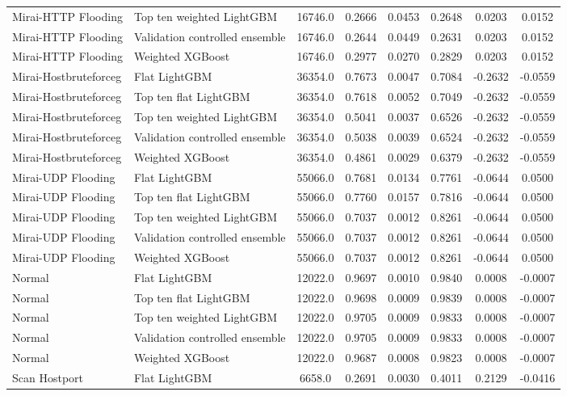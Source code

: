 \documentclass[10pt]{article}
\begin{document}
\begin{center}
\begin{longtable}{p{2.4cm}p{2.6cm}cccccc}
Mirai-HTTP Flooding & Top ten weighted LightGBM & 16746.0 & 0.2666 & 0.0453 & 0.2648 & 0.0203 & 0.0152 \\
Mirai-HTTP Flooding & Validation controlled ensemble & 16746.0 & 0.2644 & 0.0449 & 0.2631 & 0.0203 & 0.0152 \\
Mirai-HTTP Flooding & Weighted XGBoost & 16746.0 & 0.2977 & 0.0270 & 0.2829 & 0.0203 & 0.0152 \\
Mirai-Hostbruteforceg & Flat LightGBM & 36354.0 & 0.7673 & 0.0047 & 0.7084 & -0.2632 & -0.0559 \\
Mirai-Hostbruteforceg & Top ten flat LightGBM & 36354.0 & 0.7618 & 0.0052 & 0.7049 & -0.2632 & -0.0559 \\
Mirai-Hostbruteforceg & Top ten weighted LightGBM & 36354.0 & 0.5041 & 0.0037 & 0.6526 & -0.2632 & -0.0559 \\
Mirai-Hostbruteforceg & Validation controlled ensemble & 36354.0 & 0.5038 & 0.0039 & 0.6524 & -0.2632 & -0.0559 \\
Mirai-Hostbruteforceg & Weighted XGBoost & 36354.0 & 0.4861 & 0.0029 & 0.6379 & -0.2632 & -0.0559 \\
Mirai-UDP Flooding & Flat LightGBM & 55066.0 & 0.7681 & 0.0134 & 0.7761 & -0.0644 & 0.0500 \\
Mirai-UDP Flooding & Top ten flat LightGBM & 55066.0 & 0.7760 & 0.0157 & 0.7816 & -0.0644 & 0.0500 \\
Mirai-UDP Flooding & Top ten weighted LightGBM & 55066.0 & 0.7037 & 0.0012 & 0.8261 & -0.0644 & 0.0500 \\
Mirai-UDP Flooding & Validation controlled ensemble & 55066.0 & 0.7037 & 0.0012 & 0.8261 & -0.0644 & 0.0500 \\
Mirai-UDP Flooding & Weighted XGBoost & 55066.0 & 0.7037 & 0.0012 & 0.8261 & -0.0644 & 0.0500 \\
Normal & Flat LightGBM & 12022.0 & 0.9697 & 0.0010 & 0.9840 & 0.0008 & -0.0007 \\
Normal & Top ten flat LightGBM & 12022.0 & 0.9698 & 0.0009 & 0.9839 & 0.0008 & -0.0007 \\
Normal & Top ten weighted LightGBM & 12022.0 & 0.9705 & 0.0009 & 0.9833 & 0.0008 & -0.0007 \\
Normal & Validation controlled ensemble & 12022.0 & 0.9705 & 0.0009 & 0.9833 & 0.0008 & -0.0007 \\
Normal & Weighted XGBoost & 12022.0 & 0.9687 & 0.0008 & 0.9823 & 0.0008 & -0.0007 \\
Scan Hostport & Flat LightGBM & 6658.0 & 0.2691 & 0.0030 & 0.4011 & 0.2129 & -0.0416 \\

\end{longtable}
\end{center}
\end{document}
